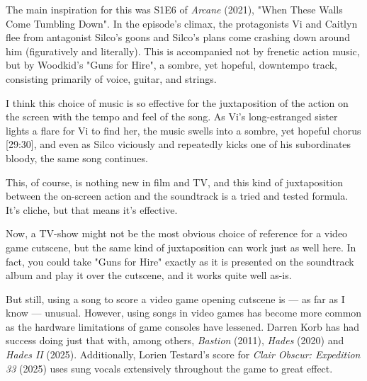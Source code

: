 

The main inspiration for this was S1E6 of \textit{Arcane}\autocite[27:30--31:20]{arcane-s1e6} (2021), "When These Walls Come Tumbling Down". In the episode's climax, the protagonists Vi and Caitlyn flee from antagonist Silco's goons and Silco's plans come crashing down around him (figuratively and literally). This is accompanied not by frenetic action music, but by Woodkid's "Guns for Hire", a sombre, yet hopeful, downtempo track, consisting primarily of voice, guitar, and strings.

I think this choice of music is so effective for the juxtaposition of the action on the screen with the tempo and feel of the song. As Vi's long-estranged sister lights a flare for Vi to find her, the music swells into a sombre, yet hopeful chorus [29:30], and even as Silco viciously and repeatedly kicks one of his subordinates bloody, the same song continues.

This, of course, is nothing new in film and TV, and this kind of juxtaposition between the on-screen action and the soundtrack is a tried and tested formula. It's cliche, but that means it's effective.

Now, a TV-show might not be the most obvious choice of reference for a video game cutscene, but the same kind of juxtaposition can work just as well here. In fact, you could take "Guns for Hire" exactly as it is presented on the soundtrack album and play it over the cutscene, and it works quite well as-is.

But still, using a song to score a video game opening cutscene is --- as far as I know --- unusual. However, using songs in video games has become more common as the hardware limitations of game consoles have lessened. Darren Korb has had success doing just that with, among others, \textit{Bastion} \autocite{8-bitmusictheoryThatsWhyBastion2026} (2011), \textit{Hades} (2020) and \textit{Hades II} (2025). Additionally, Lorien Testard's score for \textit{Clair Obscur: Expedition 33} (2025) uses sung vocals extensively throughout the game to great effect.

